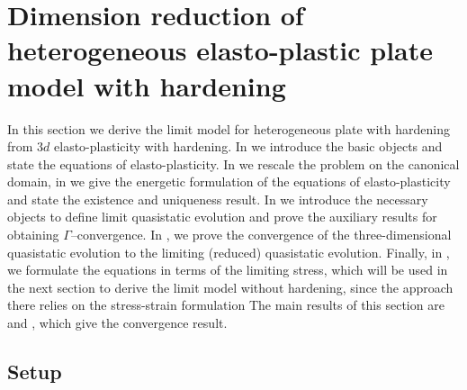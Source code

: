 \documentclass[reqno,10pt]{amsart}
\numberwithin{equation}{section}
\newtheorem{proposition}[theorem]{Proposition}
\theoremstyle{remark}
\newcommand{\M}{\mathbb{M}}
\newcommand{\R}{\mathbb{R}}
\newcommand{\calS}{\mathcal{S}}
\newcommand{\U}{U}
\DeclareMathOperator{\dev}{dev}
\DeclareMathOperator{\sym}{sym}
\renewcommand{\div}{\operatorname{div}}
\begin{document}

\section{Dimension reduction of heterogeneous elasto-plastic plate model with hardening} \label{limit of quasistatic evolutions - h to 0}

In this section we derive the limit model for heterogeneous plate with hardening from $3d$ elasto-plasticity with hardening.
In  we introduce the basic objects and state the equations of elasto-plasticity.
In  we rescale the problem on the canonical domain, in  we give the energetic formulation of the equations of elasto-plasticity and state the existence and uniqueness result.
In  we introduce the necessary objects to define limit quasistatic evolution and prove the auxiliary results for obtaining $\Gamma$--convergence.
In , we prove the convergence of the three-dimensional quasistatic evolution to the limiting (reduced) quasistatic evolution. Finally, in , we formulate the equations in terms of the limiting stress, which will be used in the next section to derive the limit model without hardening, since the approach there relies on the stress-strain formulation
The main results of this section are  and , which give the convergence result.

\subsection{Setup}\label{section setup} 
\end{document}

